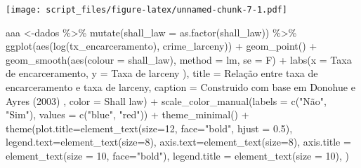 \documentclass[
]{article}
\newenvironment{Shaded}{\begin{snugshade}}{\end{snugshade}}
\newcommand{\AttributeTok}[1]{\textcolor[rgb]{0.77,0.63,0.00}{#1}}
\newcommand{\DecValTok}[1]{\textcolor[rgb]{0.00,0.00,0.81}{#1}}
\newcommand{\FloatTok}[1]{\textcolor[rgb]{0.00,0.00,0.81}{#1}}
\newcommand{\FunctionTok}[1]{\textcolor[rgb]{0.00,0.00,0.00}{#1}}
\newcommand{\NormalTok}[1]{#1}
\newcommand{\OtherTok}[1]{\textcolor[rgb]{0.56,0.35,0.01}{#1}}
\newcommand{\SpecialCharTok}[1]{\textcolor[rgb]{0.00,0.00,0.00}{#1}}
\newcommand{\StringTok}[1]{\textcolor[rgb]{0.31,0.60,0.02}{#1}}
\begin{document}
\texttt{[image: script\_files/figure-latex/unnamed-chunk-7-1.pdf]}

\begin{Shaded}
\begin{Highlighting}[]
\NormalTok{aaa }\OtherTok{\textless{}{-}}\NormalTok{dados }\SpecialCharTok{\%\textgreater{}\%} 
  \FunctionTok{mutate}\NormalTok{(}\AttributeTok{shall\_law =} \FunctionTok{as.factor}\NormalTok{(shall\_law)) }\SpecialCharTok{\%\textgreater{}\%} 
  \FunctionTok{ggplot}\NormalTok{(}\FunctionTok{aes}\NormalTok{(}\FunctionTok{log}\NormalTok{(tx\_encarceramento), crime\_larceny)) }\SpecialCharTok{+}
  \FunctionTok{geom\_point}\NormalTok{() }\SpecialCharTok{+} 
  \FunctionTok{geom\_smooth}\NormalTok{(}\FunctionTok{aes}\NormalTok{(}\AttributeTok{colour =}\NormalTok{ shall\_law), }\AttributeTok{method =} \StringTok{\textquotesingle{}lm\textquotesingle{}}\NormalTok{, }\AttributeTok{se =}\NormalTok{ F) }\SpecialCharTok{+}
  \FunctionTok{labs}\NormalTok{(}\AttributeTok{x =} \StringTok{\textquotesingle{}Taxa de encarceramento\textquotesingle{}}\NormalTok{,}
       \AttributeTok{y =} \StringTok{\textquotesingle{}Taxa de larceny )\textquotesingle{}}\NormalTok{,}
       \AttributeTok{title =} \StringTok{\textquotesingle{}Relação entre taxa de encarceramento e taxa de larceny\textquotesingle{}}\NormalTok{,}
       \AttributeTok{caption =} \StringTok{\textquotesingle{}Construido com base em Donohue e Ayres (2003)\textquotesingle{}}\NormalTok{ ,}
       \AttributeTok{color =} \StringTok{\textquotesingle{}Shall law\textquotesingle{}}\NormalTok{) }\SpecialCharTok{+} 
  \FunctionTok{scale\_color\_manual}\NormalTok{(}\AttributeTok{labels =} \FunctionTok{c}\NormalTok{(}\StringTok{"Não"}\NormalTok{, }\StringTok{"Sim"}\NormalTok{), }\AttributeTok{values =} \FunctionTok{c}\NormalTok{(}\StringTok{"blue"}\NormalTok{, }\StringTok{"red"}\NormalTok{)) }\SpecialCharTok{+} 
  \FunctionTok{theme\_minimal}\NormalTok{() }\SpecialCharTok{+}
  \FunctionTok{theme}\NormalTok{(}\AttributeTok{plot.title=}\FunctionTok{element\_text}\NormalTok{(}\AttributeTok{size=}\DecValTok{12}\NormalTok{, }\AttributeTok{face=}\StringTok{"bold"}\NormalTok{, }\AttributeTok{hjust =} \FloatTok{0.5}\NormalTok{),}
        \AttributeTok{legend.text=}\FunctionTok{element\_text}\NormalTok{(}\AttributeTok{size=}\DecValTok{8}\NormalTok{),}
        \AttributeTok{axis.text=}\FunctionTok{element\_text}\NormalTok{(}\AttributeTok{size=}\DecValTok{8}\NormalTok{),}
        \AttributeTok{axis.title =} \FunctionTok{element\_text}\NormalTok{(}\AttributeTok{size =} \DecValTok{10}\NormalTok{, }\AttributeTok{face=}\StringTok{"bold"}\NormalTok{),}
        \AttributeTok{legend.title =} \FunctionTok{element\_text}\NormalTok{(}\AttributeTok{size =} \DecValTok{10}\NormalTok{),}
\NormalTok{  )}



\end{Highlighting}
\end{Shaded}
\end{document}

